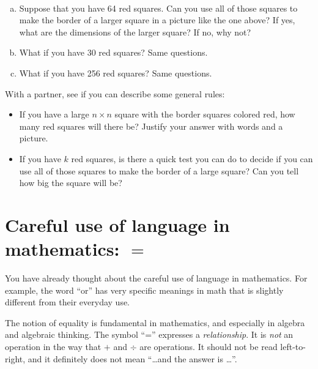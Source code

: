 \bigskip

\begin{problem}\ 
\begin{enumerate}[(a)]
\item
Suppose that you have 64 red squares.  Can you use all of those squares to make the border of a larger square in a picture like the one above?  If yes, what are the dimensions of the larger square?  If no, why not?\\
\item
What if you have 30 red squares?  Same questions.\\
\item
What if you have 256 red squares?  Same questions.\\
\end{enumerate}
\end{problem}

\bigskip


\begin{thinkpair*}
With a partner, see if you can describe some general rules:
\begin{itemize}
\item
If you have a large $n \times n$ square with the border squares colored red, how many red squares will there be?  Justify your answer with words and a picture.\\

\item
If you have $k$ red squares, is there a quick test you can do to decide if you can use all of those squares to make the border of a large square?  Can you tell how big the square will be?
\end{itemize}
\end{thinkpair*}

\newpage




\section{Careful use of language in mathematics: $=$}
You have already thought about the careful use of language in mathematics.  For example, the word ``or'' has very specific meanings in math that is slightly different from their everyday use.

The notion of equality is fundamental in mathematics, and especially in algebra and algebraic thinking.  The symbol ``='' expresses a \emph{relationship}.  It is \emph{not} an operation in the way that $+$ and $\div$ are operations.  It should not be read left-to-right, and it definitely does not mean ``\dots and the answer is \dots''.


